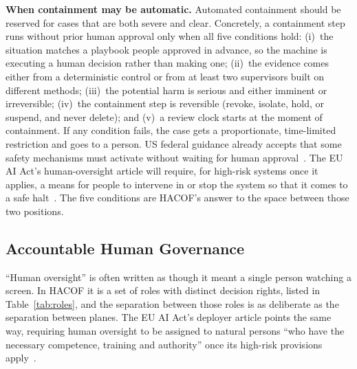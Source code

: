 \documentclass{ieeeaccess}
\newcommand{\hacof}{HACOF}
\begin{document}
\textbf{When containment may be automatic.} Automated containment should be reserved for cases that are both severe and clear. Concretely, a containment step runs without prior human approval only when all five conditions hold: (i)~the situation matches a playbook people approved in advance, so the machine is executing a human decision rather than making one; (ii)~the evidence comes either from a deterministic control or from at least two supervisors built on different methods; (iii)~the potential harm is serious and either imminent or irreversible; (iv)~the containment step is reversible (revoke, isolate, hold, or suspend, and never delete); and (v)~a review clock starts at the moment of containment. If any condition fails, the case gets a proportionate, time-limited restriction and goes to a person. US federal guidance already accepts that some safety mechanisms must activate without waiting for human approval~\cite{omb2025m2521}.
The EU AI Act's human-oversight article will require, for high-risk systems once it applies, a means for people to intervene in or stop the system so that it comes to a safe halt~\cite{euaiact2024}.
The five conditions are \hacof's answer to the space between those two positions.

\subsection{Accountable Human Governance}
\label{sec:hacof-human}

``Human oversight'' is often written as though it meant a single person watching a screen. In \hacof{} it is a set of roles with distinct decision rights, listed in Table~\ref{tab:roles}, and the separation between those roles is as deliberate as the separation between planes. The EU AI Act's deployer article points the same way, requiring human oversight to be assigned to natural persons ``who have the necessary competence, training and authority'' once its high-risk provisions apply~\cite{euaiact2024,euaiomnibus2026}.
\end{document}
